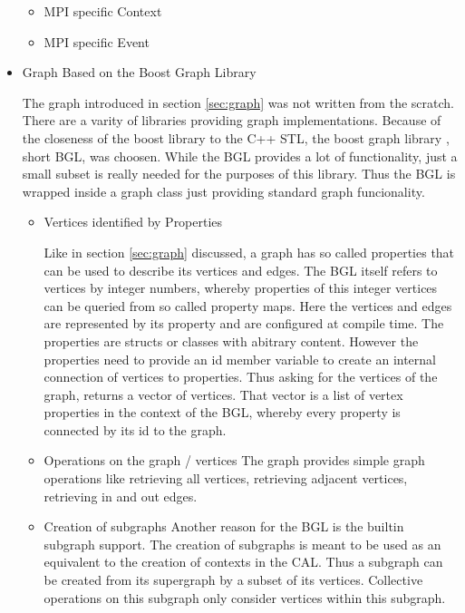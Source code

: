 \begin{itemize}
\begin{itemize}
  \item MPI specific Context
  \item MPI specific Event
  \end{itemize}

\item Graph Based on the Boost Graph Library

  The graph introduced in section \ref{sec:graph} was not written from
  the scratch. There are a varity of libraries providing graph
  implementations. Because of the closeness of the boost library to
  the C++ STL, the boost graph library \cite{ref:boost::bgl}, short
  BGL, was choosen. While the BGL provides a lot of functionality,
  just a small subset is really needed for the purposes of this
  library. Thus the BGL is wrapped inside a graph class just providing
  standard graph funcionality.

  \begin{itemize}  

  \item Vertices identified by Properties

    Like in section \ref{sec:graph} discussed, a graph has so called
    properties that can be used to describe its vertices and
    edges. The BGL itself refers to vertices by integer numbers,
    whereby properties of this integer vertices can be queried from so
    called property maps. Here the vertices and edges are represented
    by its property and are configured at compile time.  The
    properties are structs or classes with abitrary content. However
    the properties need to provide an id member variable to create an
    internal connection of vertices to properties.  Thus asking for
    the vertices of the graph, returns a vector of vertices. That
    vector is a list of vertex properties in the context of the BGL,
    whereby every property is connected by its id to the graph.
  
  \item Operations on the graph / vertices
    The graph provides simple graph operations like retrieving all
    vertices, retrieving adjacent vertices, retrieving in and out
    edges.

  \item Creation of subgraphs
    Another reason for the BGL is the builtin subgraph support. The
    creation of subgraphs is meant to be used as an equivalent to the
    creation of contexts in the CAL. Thus a subgraph can be created from its
    supergraph by a subset of its vertices. Collective operations on
    this subgraph only consider vertices within this subgraph.
  \end{itemize}


\end{itemize}
